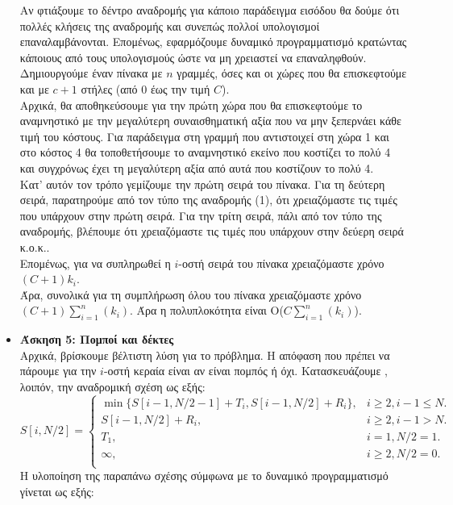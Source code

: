 \documentclass[12pt]{article}
\begin{document}
\begin{itemize}[label=$\blacktriangleright$]
Αν φτιάξουμε το δέντρο αναδρομής για κάποιο παράδειγμα εισόδου θα δούμε ότι πολλές κλήσεις της αναδρομής και συνεπώς πολλοί υπολογισμοί επαναλαμβάνονται. Επομένως, εφαρμόζουμε δυναμικό προγραμματισμό κρατώντας κάποιους από τους υπολογισμούς ώστε να μη χρειαστεί να επαναληφθούν.\\
Δημιουργούμε έναν πίνακα με $n$ γραμμές, όσες και οι χώρες που θα επισκεφτούμε και με $c+1$ στήλες (από 0 έως την τιμή $C$).\\
Αρχικά, θα αποθηκεύσουμε για την πρώτη χώρα που θα επισκεφτούμε το αναμνηστικό με την μεγαλύτερη συναισθηματική αξία που να μην ξεπερνάει κάθε τιμή του κόστους. Για παράδειγμα στη γραμμή που αντιστοιχεί στη χώρα 1 και στο κόστος 4 θα τοποθετήσουμε το αναμνηστικό εκείνο που κοστίζει το πολύ 4 και συγχρόνως έχει τη μεγαλύτερη αξία από αυτά που κοστίζουν το πολύ 4.\\
Κατ' αυτόν τον τρόπο γεμίζουμε την πρώτη σειρά του πίνακα. Για τη δεύτερη σειρά, παρατηρούμε από τον τύπο της αναδρομής (1), ότι χρειαζόμαστε τις τιμές που υπάρχουν στην πρώτη σειρά. Για την τρίτη σειρά, πάλι από τον τύπο της αναδρομής, βλέπουμε ότι χρειαζόμαστε τις τιμές που υπάρχουν στην δεύερη σειρά κ.ο.κ..\\
Επομένως, για να συπληρωθεί η $i$-οστή σειρά του πίνακα χρειαζόμαστε χρόνο $(C+1)k_i$.\\
Άρα, συνολικά για τη συμπλήρωση όλου του πίνακα χρειαζόμαστε χρόνο $(C+1)\sum_{i=1}^{n}(k_i)$. Άρα η πολυπλοκότητα είναι Ο($C\sum_{i=1}^{n}(k_i)$).
\item \textbf{Άσκηση 5: Πομποί και δέκτες}\\
\hfill \break
Αρχικά, βρίσκουμε βέλτιστη λύση για το πρόβλημα. Η απόφαση που πρέπει να πάρουμε για την $i$-οστή κεραία είναι αν είναι πομπός ή όχι. Κατασκευάζουμε , λοιπόν, την αναδρομική σχέση ως εξής:
\begin{equation}
 S[i,N/2]=
 \begin{cases}
  	\min\{S[i-1,N/2-1]+T_i,S[i-1,N/2]+R_i\}, & \text{$i\geq2, i-1\leq N$}.\\
  	{S[i-1,N/2]+R_i}, & \text{$i\geq2, i-1>N$}.\\
  	T_1, & \text{$i=1, 	N/2=1$}.\\
  	\infty, & \text{$i\geq2, N/2=0$}.\\
  \end{cases}
\end{equation}
Η υλοποίηση της παραπάνω σχέσης σύμφωνα με το δυναμικό προγραμματισμό γίνεται ως εξής:\\

\end{itemize}
\end{document}

